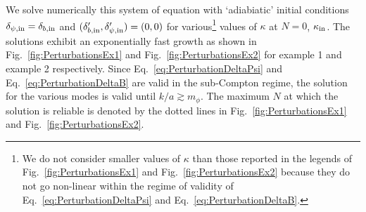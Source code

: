 \documentclass[a4paper, amsfonts, amssymb, amsmath, reprint, showkeys, nofootinbib, twoside, superscriptaddress]{revtex4-1}
\begin{document}
We solve numerically this system of equation with ‘adiabiatic’ initial conditions $\delta_{\psi, \rm{in}} = \delta_{b, \rm{in}}$ and $(\delta'_{b, \rm{in}}, \delta'_{\psi, \rm{in}})=(0,0)$ for various\footnote{We do not consider smaller values of $\kappa$ than those reported in the legends of Fig.~\ref{fig:PerturbationsEx1} and Fig.~\ref{fig:PerturbationsEx2} because they do not go non-linear within the regime of validity of Eq.~\eqref{eq:PerturbationDeltaPsi} and Eq.~\eqref{eq:PerturbationDeltaB}.} values of $\kappa$ at $N = 0$, $\kappa_{\rm in}$. The solutions exhibit an exponentially fast growth as shown in Fig.~\ref{fig:PerturbationsEx1} and Fig.~\ref{fig:PerturbationsEx2} for example 1 and example 2 respectively. Since Eq.~\eqref{eq:PerturbationDeltaPsi} and Eq.~\eqref{eq:PerturbationDeltaB} are valid in the sub-Compton regime, the solution for the various modes is valid until $k/a \gtrsim m_\phi$. The maximum $N$ at which the solution is reliable is denoted by the dotted lines in Fig.~\ref{fig:PerturbationsEx1} and Fig.~\ref{fig:PerturbationsEx2}.
\end{document}
